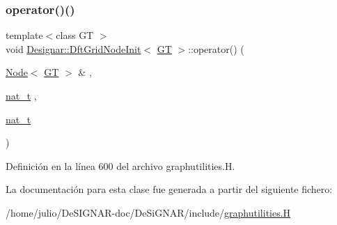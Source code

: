 \subsubsection{\texorpdfstring{operator()()}{operator()()}}
{\footnotesize\ttfamily template$<$class GT $>$ \\
void \hyperlink{class_designar_1_1_dft_grid_node_init}{Designar\+::\+Dft\+Grid\+Node\+Init}$<$ \hyperlink{demo-buildgraph_8_c_a3001c40d2c31ca87ed96cd7d1334a55e}{GT} $>$\+::operator() (\begin{DoxyParamCaption}\item[{\hyperlink{namespace_designar_a5af326c65aa2bd26b26c410f2030d09e}{Node}$<$ \hyperlink{demo-buildgraph_8_c_a3001c40d2c31ca87ed96cd7d1334a55e}{GT} $>$ \&}]{,  }\item[{\hyperlink{namespace_designar_aa72662848b9f4815e7bf31a7cf3e33d1}{nat\+\_\+t}}]{,  }\item[{\hyperlink{namespace_designar_aa72662848b9f4815e7bf31a7cf3e33d1}{nat\+\_\+t}}]{ }\end{DoxyParamCaption})\hspace{0.3cm}{\ttfamily [inline]}}



Definición en la línea 600 del archivo graphutilities.\+H.



La documentación para esta clase fue generada a partir del siguiente fichero\+:\begin{DoxyCompactItemize}
\item 
/home/julio/\+De\+S\+I\+G\+N\+A\+R-\/doc/\+De\+Si\+G\+N\+A\+R/include/\hyperlink{graphutilities_8_h}{graphutilities.\+H}\end{DoxyCompactItemize}
